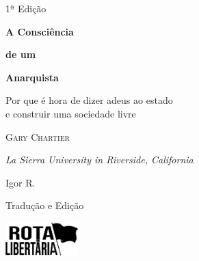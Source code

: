 

\begin{titlepage}
	\center	
	
	\vspace{30pt}
	
	\fontsize{14}{20}\selectfont\textsf{1ª Edição}
	
	\vspace{5pt}
	\fontsize{44}{52}\selectfont\textbf{A Consciência}
	
	\fontsize{26}{32}\selectfont\textbf{de um}
	
	\vspace{-28pt}
	\fontsize{56}{70}\selectfont\textbf{Anarquista}
	
	\vspace{10pt}
	\fontsize{20}{26}\selectfont\textsf{Por que é hora de dizer adeus ao estado\\e construir uma sociedade livre}
	
	
	
	
	\vfill
	
	\LARGE\textsc{Gary Chartier}
	
	\normalsize\emph{La Sierra University in Riverside, California} 
	 
	\vfill 
	        
	\large Igor R.
	
	\normalsize Tradução e Edição
	
	\vfill
	
	\includegraphics[width=1.1in]{./assets/fl}
\end{titlepage}

\restoregeometry  